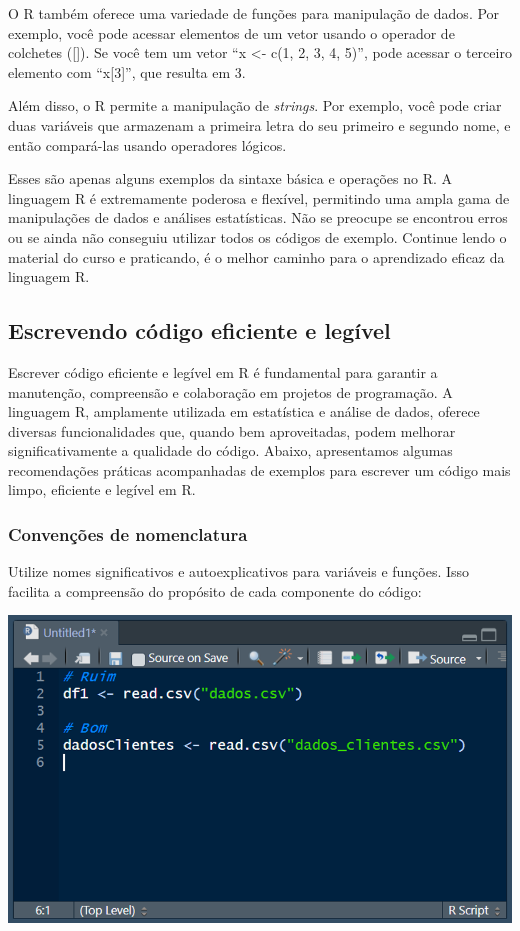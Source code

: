 \documentclass[
]{book}
\begin{document}
O R também oferece uma variedade de funções para manipulação de dados. Por exemplo, você pode acessar elementos de um vetor usando o operador de colchetes ({[}{]}). Se você tem um vetor ``x \textless- c(1, 2, 3, 4, 5)'', pode acessar o terceiro elemento com ``x{[}3{]}'', que resulta em 3.

Além disso, o R permite a manipulação de \emph{strings}. Por exemplo, você pode criar duas variáveis que armazenam a primeira letra do seu primeiro e segundo nome, e então compará-las usando operadores lógicos.

Esses são apenas alguns exemplos da sintaxe básica e operações no R. A linguagem R é extremamente poderosa e flexível, permitindo uma ampla gama de manipulações de dados e análises estatísticas. Não se preocupe se encontrou erros ou se ainda não conseguiu utilizar todos os códigos de exemplo. Continue lendo o material do curso e praticando, é o melhor caminho para o aprendizado eficaz da linguagem R.

\subsection{Escrevendo código eficiente e legível}\label{escrevendo-cuxf3digo-eficiente-e-leguxedvel}

Escrever código eficiente e legível em R é fundamental para garantir a manutenção, compreensão e colaboração em projetos de programação. A linguagem R, amplamente utilizada em estatística e análise de dados, oferece diversas funcionalidades que, quando bem aproveitadas, podem melhorar significativamente a qualidade do código. Abaixo, apresentamos algumas recomendações práticas acompanhadas de exemplos para escrever um código mais limpo, eficiente e legível em R.

\subsubsection{Convenções de nomenclatura}\label{convenuxe7uxf5es-de-nomenclatura}

Utilize nomes significativos e autoexplicativos para variáveis e funções. Isso facilita a compreensão do propósito de cada componente do código:

\includegraphics{images/clipboard-2315088477.png}
\end{document}
